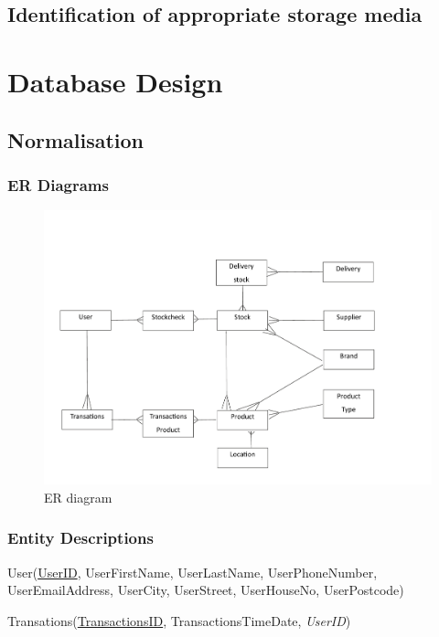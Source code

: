 \subsection{Identification of appropriate storage media}

  


\section{Database Design}

\subsection{Normalisation}

\subsubsection{ER Diagrams}

\begin{figure}[H]
    \includegraphics[width=\textwidth]{./Design/pdfimages/ER_diagram.pdf}
    \caption{ER diagram} \label{fig:ER diagram}
\end{figure}

\subsubsection{Entity Descriptions}

User(\underline{UserID}, UserFirstName, UserLastName, UserPhoneNumber, UserEmailAddress, UserCity, UserStreet, UserHouseNo, UserPostcode)

Transations(\underline{TransactionsID}, TransactionsTimeDate, \emph{UserID})


